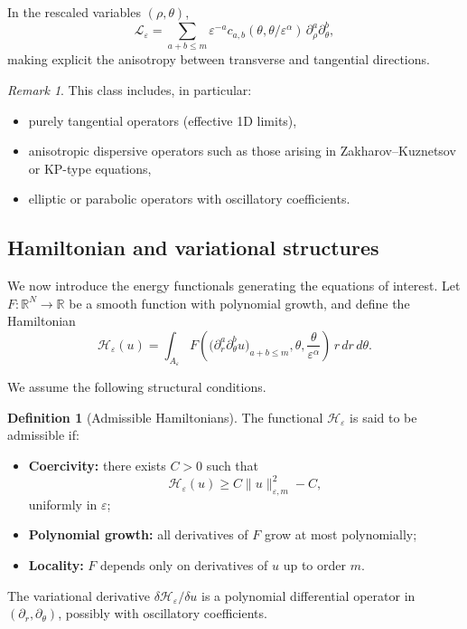 \documentclass[11pt]{amsart}
\theoremstyle{plain}
\theoremstyle{definition}
\newtheorem{definition}[theorem]{Definition}
\theoremstyle{remark}
\newtheorem{remark}[theorem]{Remark}
\theoremstyle{remark}
\begin{document}
In the rescaled variables $(\rho,\theta)$,
\[
\mathcal L_\varepsilon
=
\sum_{a+b\le m}
\varepsilon^{-a}
c_{a,b}(\theta,\theta/\varepsilon^\alpha)\,
\partial_\rho^a\partial_\theta^b,
\]
making explicit the anisotropy between transverse and tangential
directions.

\begin{remark}
This class includes, in particular:
\begin{itemize}
\item purely tangential operators (effective 1D limits),
\item anisotropic dispersive operators such as those arising in
Zakharov--Kuznetsov or KP-type equations,
\item elliptic or parabolic operators with oscillatory coefficients.
\end{itemize}
\end{remark}

\subsection{Hamiltonian and variational structures}

We now introduce the energy functionals generating the equations of
interest.
Let $F:\mathbb R^N\to\mathbb R$ be a smooth function with polynomial
growth, and define the Hamiltonian
\[
\mathcal H_\varepsilon(u)
=
\int_{A_\varepsilon}
F\!\left(
\bigl(\partial_r^a\partial_\theta^b u\bigr)_{a+b\le m},
\theta,\frac{\theta}{\varepsilon^\alpha}
\right)
\,r\,dr\,d\theta.
\]

We assume the following structural conditions.

\begin{definition}[Admissible Hamiltonians]
The functional $\mathcal H_\varepsilon$ is said to be admissible if:
\begin{itemize}
\item \textbf{Coercivity:}
there exists $C>0$ such that
\[
\mathcal H_\varepsilon(u)
\ge
C\|u\|_{\varepsilon,m}^2 - C,
\]
uniformly in $\varepsilon$;
\item \textbf{Polynomial growth:}
all derivatives of $F$ grow at most polynomially;
\item \textbf{Locality:}
$F$ depends only on derivatives of $u$ up to order $m$.
\end{itemize}
\end{definition}

The variational derivative $\delta\mathcal H_\varepsilon/\delta u$ is a
polynomial differential operator in $(\partial_r,\partial_\theta)$,
possibly with oscillatory coefficients.
\end{document}
